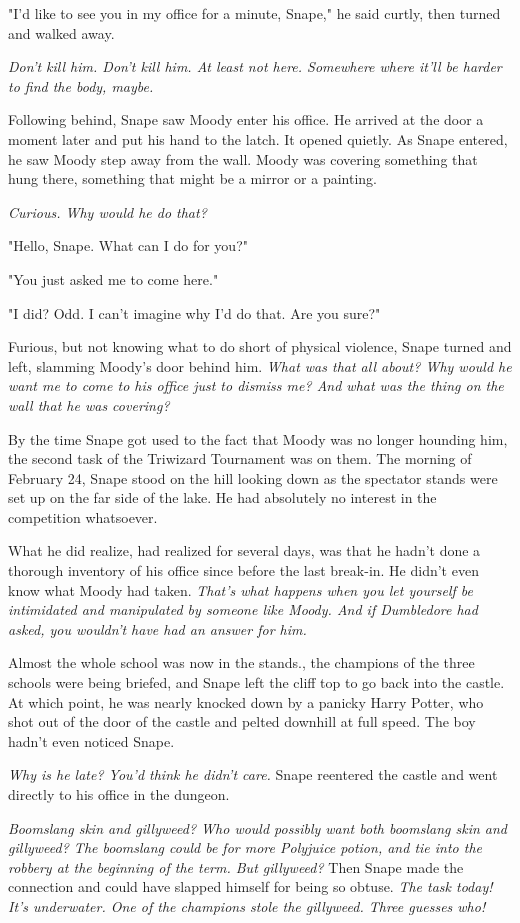 "I'd like to see you in my office for a minute, Snape," he said curtly, then turned and walked away.

\emph{Don't kill him. Don't kill him. At least not here. Somewhere where it'll be harder to find the body, maybe.}

Following behind, Snape saw Moody enter his office. He arrived at the door a moment later and put his hand to the latch. It opened quietly. As Snape entered, he saw Moody step away from the wall. Moody was covering something that hung there, something that might be a mirror or a painting.

\emph{Curious. Why would he do that?}

"Hello, Snape. What can I do for you?"

"You just asked me to come here."

"I did? Odd. I can't imagine why I'd do that. Are you sure?"

Furious, but not knowing what to do short of physical violence, Snape turned and left, slamming Moody's door behind him. \emph{What was that all about? Why would he want me to come to his office just to dismiss me? And what was the thing on the wall that he was covering?}

By the time Snape got used to the fact that Moody was no longer hounding him, the second task of the Triwizard Tournament was on them. The morning of February 24, Snape stood on the hill looking down as the spectator stands were set up on the far side of the lake. He had absolutely no interest in the competition whatsoever.

What he did realize, had realized for several days, was that he hadn't done a thorough inventory of his office since before the last break-in. He didn't even know what Moody had taken. \emph{That's what happens when you let yourself be intimidated and manipulated by someone like Moody. And if Dumbledore had asked, you wouldn't have had an answer for him.}

Almost the whole school was now in the stands., the champions of the three schools were being briefed, and Snape left the cliff top to go back into the castle. At which point, he was nearly knocked down by a panicky Harry Potter, who shot out of the door of the castle and pelted downhill at full speed. The boy hadn't even noticed Snape.

\emph{Why is he late? You'd think he didn't care.} Snape reentered the castle and went directly to his office in the dungeon.

\emph{Boomslang skin and gillyweed? Who would possibly want both boomslang skin and gillyweed? The boomslang could be for more Polyjuice potion, and tie into the robbery at the beginning of the term. But gillyweed?} Then Snape made the connection and could have slapped himself for being so obtuse. \emph{The task today! It's underwater. One of the champions stole the gillyweed. Three guesses who!}

